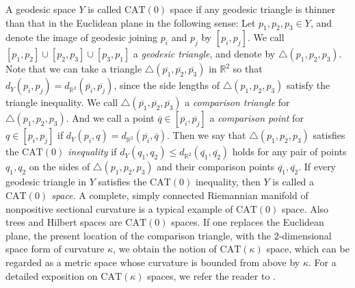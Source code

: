 \documentclass[12pt]{amsart}
\numberwithin{equation}{section}
\theoremstyle{plain}
\theoremstyle{definition}
\theoremstyle{remark}
\newcommand{\R}{{\mathbb R}}
\newcommand{\cat}[1]{\mathrm{CAT}(#1)}
\newcommand{\tri}[3]{\triangle(#1,#2,#3)}
\begin{document}
A geodesic space $Y$ is called $\cat{0}$ space if any geodesic triangle
is thinner than that in the Euclidean plane in the following sense: 
Let $p_1,p_2,p_3 \in Y$, and denote the image of geodesic joining $p_i$
and $p_j$ by $[p_i,p_j]$. 
We call $[p_1,p_2]\cup [p_2,p_3]\cup [p_3,p_1]$ a {\it geodesic
triangle}, and denote by $\tri{p_1}{p_2}{p_3}$. 
Note that we can take 
a triangle $\tri{\overline{p_1}}{\overline{p_2}}{\overline{p_3}}$ in
$\R^2$ so that $d_Y(p_i, p_j)=d_{\R^2}(\overline{p_i},\overline{p_j})$,
since the side lengths of $\tri{p_1}{p_2}{p_3}$ satisfy the triangle
inequality. 
We call $\tri{\overline{p_1}}{\overline{p_2}}{\overline{p_3}}$ a 
{\it comparison triangle} for $\tri{p_1}{p_2}{p_3}$.  
And we call a point 
$\overline{q}\in [\overline{p_i},\overline{p_j}]$
a {\it comparison point} for $q\in [p_i,p_j]$ if 
$d_Y(p_i,q) = d_{\R^2}(\overline{p_i}, \overline{q})$.
Then we say that $\tri{p_1}{p_2}{p_3}$ satisfies the 
{\it $\cat{0}$ inequality}
if $d_Y(q_1,q_2) \leq d_{\R^2}(\overline{q_1}, \overline{q_2})$ holds
for any pair of points $q_1, q_2$ on the sides of $\tri{p_1}{p_2}{p_3}$
and their comparison points $\overline{q_1}, \overline{q_2}$. 
If every geodesic triangle in $Y$ satisfies the $\cat{0}$ inequality, 
then $Y$ is called a {\it $\cat{0}$ space}. 
A complete, simply
connected Riemannian manifold of nonpositive sectional curvature is a
typical example of $\cat{0}$ space.  Also trees and Hilbert spaces are
$\cat{0}$ spaces. 
If one replaces the Euclidean plane, the present location of the
comparison triangle, with the $2$-dimensional space form of curvature
$\kappa$, we obtain the notion of $\cat{\kappa}$ space, which can be
regarded as a metric space whose curvature is bounded from above by
$\kappa$. 
For a detailed exposition on $\cat{\kappa}$ spaces, we refer the reader
to \cite{bridson-haefliger}. 
\end{document}
